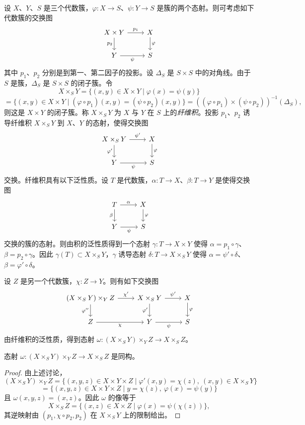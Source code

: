 设 $X$、$Y$、$S$ 是三个代数簇，$\varphi:X\to S$、$\psi:Y\to S$ 是簇的两个态射。则可考虑如下代数簇的交换图
$$\begin{tikzcd}
X\times Y \arrow[r,"p_1"] \arrow[d,"p_2"' ] & X \arrow[d,"\varphi"]\\
Y \arrow[r,"\psi"'] & S
\end{tikzcd}$$
其中 $p_1$、$p_2$ 分别是到第一、第二因子的投影。设 $\Delta_S$ 是 $S\times S$ 中的对角线。由于 $S$ 是簇，$\Delta_S$ 是 $S\times S$ 的闭子簇。令
$$X\times_SY=\{(x,y)\in X\times Y\mid\varphi(x)=\psi(y)\}$$
$$=\{(x,y)\in X\times Y\mid(\varphi\circ p_1)(x,y)=(\psi\circ p_2)(x,y)\}
=((\varphi\circ p_1)\times(\psi\circ p_2))^{-1}(\Delta_S),$$
则这是 $X\times Y$ 的闭子簇。称 $X\times_SY$ 为 $X$ 与 $Y$ 在 $S$ 上的\emph{纤维积}。投影 $p_1$、$p_2$ 诱导纤维积 $X\times_SY$ 到 $X$、$Y$ 的态射，使得交换图
$$\begin{tikzcd}
X\times_SY \arrow[r,"\psi'"] \arrow[d,"\varphi'"' ] & X \arrow[d,"\varphi"]\\
Y \arrow[r,"\psi"'] & S
\end{tikzcd}$$
交换。纤维积具有以下泛性质。设 $T$ 是代数簇，$\alpha:T\to X$、$\beta:T\to Y$ 是使得交换图
$$\begin{tikzcd}
T \arrow[r,"\alpha"] \arrow[d,"\beta"' ] & X \arrow[d,"\varphi"]\\
Y \arrow[r,"\psi"'] & S
\end{tikzcd}$$
交换的簇的态射。则由积的泛性质得到一个态射 $\gamma:T\to X\times Y$ 使得 $\alpha=p_1\circ\gamma$、$\beta=p_2\circ\gamma$。因此 $\gamma(T)\subset X\times_SY$，$\gamma$ 诱导态射 $\delta:T\to X\times_SY$ 使得 $\alpha=\psi'\circ\delta$、$\beta=\varphi'\circ\delta$。

设 $Z$ 是另一个代数簇，$\chi:Z\to Y$。则有如下交换图
$$\begin{tikzcd}
(X\times_SY)\times_YZ \arrow[r,"\chi'"] \arrow[d,"\varphi''"'] &
X\times_SY \arrow[r,"\psi'"] \arrow[d,"\varphi'"'] & X \arrow[d,"\varphi"]\\
Z \arrow[r,"\chi"'] & Y \arrow[r,"\psi"'] & S
\end{tikzcd}$$
由纤维积的泛性质，得到态射 $\omega:(X\times_SY)\times_YZ\to X\times_SZ$。

\begin{lemma}\label{lem:4.10.1}
态射 $\omega:(X\times_SY)\times_YZ\to X\times_SZ$ 是同构。
\end{lemma}

\begin{proof}
由上述讨论，
$$(X\times_SY)\times_YZ=\{(x,y,z)\in X\times Y\times Z\mid\varphi'(x,y)=\chi(z),\ (x,y)\in X\times_SY\}$$
$$=\{(x,y,z)\in X\times Y\times Z\mid y=\chi(z),\ \varphi(x)=\psi(y)\}$$
且 $\omega(x,y,z)=(x,z)$。因此 $\omega$ 的像等于
$$X\times_SZ=\{(x,z)\in X\times Z\mid\varphi(x)=\psi(\chi(z))\},$$
其逆映射由 $(p_1,\chi\circ p_2,p_2)$ 在 $X\times_SY$ 上的限制给出。
\end{proof}


